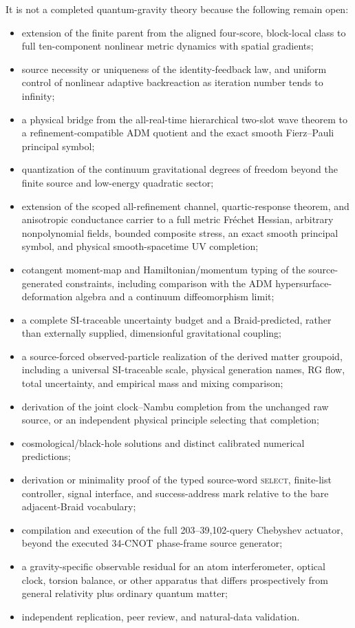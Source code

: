 \documentclass[11pt]{article}
\theoremstyle{definition}
\theoremstyle{remark}
\begin{document}
It is not a completed quantum-gravity theory because the following remain open:
\par\medskip
\begin{itemize}
\item extension of the finite parent from the aligned four-score, block-local class to full ten-component nonlinear metric dynamics with spatial gradients;
\item source necessity or uniqueness of the identity-feedback law, and uniform control of nonlinear adaptive backreaction as iteration number tends to infinity;
\item a physical bridge from the all-real-time hierarchical two-slot wave theorem to a refinement-compatible ADM quotient and the exact smooth Fierz--Pauli principal symbol;
\item quantization of the continuum gravitational degrees of freedom beyond the finite source and low-energy quadratic sector;
\item extension of the scoped all-refinement channel, quartic-response theorem, and anisotropic conductance carrier to a full metric Fr\'echet Hessian, arbitrary nonpolynomial fields, bounded composite stress, an exact smooth principal symbol, and physical smooth-spacetime UV completion;
\item cotangent moment-map and Hamiltonian/momentum typing of the source-generated constraints, including comparison with the ADM hypersurface-deformation algebra and a continuum diffeomorphism limit;
\item a complete SI-traceable uncertainty budget and a Braid-predicted, rather than externally supplied, dimensionful gravitational coupling;
\item a source-forced observed-particle realization of the derived matter groupoid, including a universal SI-traceable scale, physical generation names, RG flow, total uncertainty, and empirical mass and mixing comparison;
\item derivation of the joint clock--Nambu completion from the unchanged raw source, or an independent physical principle selecting that completion;
\item cosmological/black-hole solutions and distinct calibrated numerical predictions;
\item derivation or minimality proof of the typed source-word \textsc{select}, finite-list controller, signal interface, and success-address mark relative to the bare adjacent-Braid vocabulary;
\item compilation and execution of the full 203--39,102-query Chebyshev actuator, beyond the executed 34-CNOT phase-frame source generator;
\item a gravity-specific observable residual for an atom interferometer, optical clock, torsion balance, or other apparatus that differs prospectively from general relativity plus ordinary quantum matter;
\item independent replication, peer review, and natural-data validation.
\end{itemize}
\end{document}
